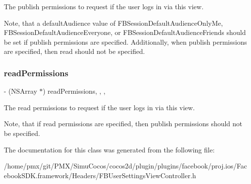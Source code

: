 The publish permissions to request if the user logs in via this view.

Note, that a default\+Audience value of F\+B\+Session\+Default\+Audience\+Only\+Me, F\+B\+Session\+Default\+Audience\+Everyone, or F\+B\+Session\+Default\+Audience\+Friends should be set if publish permissions are specified. Additionally, when publish permissions are specified, then read should not be specified. \mbox{\label{interfaceFBUserSettingsViewController_af56bf48947bab6965b9110d6896fb545}} 
\subsubsection{\texorpdfstring{read\+Permissions}{readPermissions}}
{\footnotesize\ttfamily -\/ (N\+S\+Array $\ast$) read\+Permissions\hspace{0.3cm}{\ttfamily [read]}, {\ttfamily [write]}, {\ttfamily [nonatomic]}, {\ttfamily [copy]}}

The read permissions to request if the user logs in via this view.

Note, that if read permissions are specified, then publish permissions should not be specified. 

The documentation for this class was generated from the following file\+:\begin{DoxyCompactItemize}
\item 
/home/pmx/git/\+P\+M\+X/\+Simu\+Cocos/cocos2d/plugin/plugins/facebook/proj.\+ios/\+Facebook\+S\+D\+K.\+framework/\+Headers/F\+B\+User\+Settings\+View\+Controller.\+h\end{DoxyCompactItemize}
